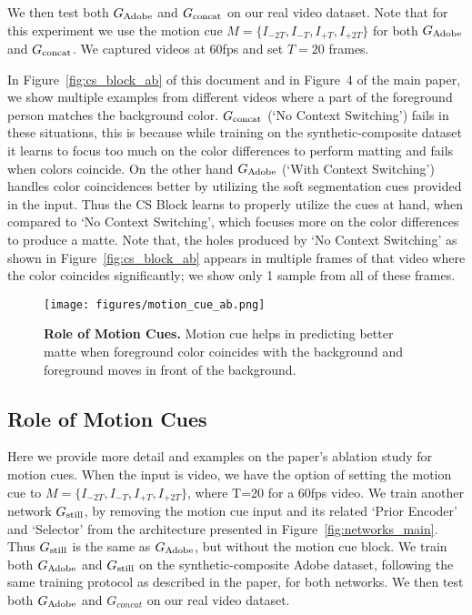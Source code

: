 \documentclass[10pt,twocolumn,letterpaper]{article}
\begin{document}
We then test both $G_{\rm Adobe}$ and $G_{\rm concat}$ on our real video dataset. Note that for this experiment we use the motion cue $M=\{I_{-2T},I_{-T},I_{+T},I_{+2T}\}$ for both $G_{\rm Adobe}$ and $G_{\rm concat}$. We captured videos at 60fps and set $T=20$ frames.

In Figure~\ref{fig:cs_block_ab} of this document and in Figure~4 of the main paper, we show multiple examples from different videos where a part of the foreground person matches the background color. $G_{\rm concat}$ (`No Context Switching') fails in these situations, this is because while training on the synthetic-composite dataset it learns to focus too much on the color differences to perform matting and fails when colors coincide. On the other hand $G_{\rm Adobe}$ (`With Context Switching') handles color coincidences better by utilizing the soft segmentation cues provided in the input. Thus the CS Block learns to properly utilize the cues at hand, when compared to `No Context Switching', which focuses more on the color differences to produce a matte. Note that, the holes produced by `No Context Switching' as shown in Figure~\ref{fig:cs_block_ab} appears in multiple frames of that video where the color coincides significantly; we show only 1 sample from all of these frames.

\begin{figure}[!ht]
	\centering
	\texttt{[image: figures/motion\_cue\_ab.png]}
	\caption{\small \textbf{Role of Motion Cues.} Motion cue helps in predicting better matte when foreground color coincides with the background and foreground moves in front of the background.}
\label{fig:motion_cue_ab}	
\end{figure}

\subsection{Role of Motion Cues}
\label{sec:motion_cue}

Here we provide more detail and examples on the paper's ablation study for motion cues.  When the input is video, we have the option of setting the motion cue to $M=\{I_{-2T},I_{-T},I_{+T},I_{+2T}\}$, where T=20 for a 60fps video. We train another network $G_{\rm still}$, by removing the motion cue input and its related `Prior Encoder' and `Selector' from the architecture presented in Figure~\ref{fig:networks_main}. Thus $G_{\rm still}$ is the same as $G_{\rm Adobe}$, but without the motion cue block. We train both $G_{\rm Adobe}$ and $G_{\rm still}$ on the synthetic-composite Adobe dataset, following the same training protocol as described in the paper, for both networks. We then test both $G_{\rm Adobe}$ and $G_{concat}$ on our real video dataset.
\end{document}
